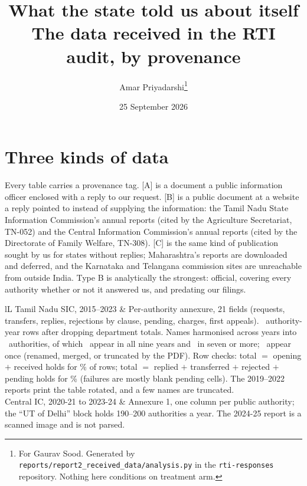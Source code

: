 \documentclass[11pt]{article}
\title{What the state told us about itself\\[2pt]\large The data received in the RTI audit, by provenance}
\author{Amar Priyadarshi\thanks{For Gaurav Sood. Generated by \texttt{reports/report2\_received\_data/analysis.py} in the \texttt{rti-responses} repository. Nothing here conditions on treatment arm.}}
\date{25 September 2026}
\newcommand{\prov}[1]{\textsf{\footnotesize[#1]}}
\begin{document}
\maketitle

\section*{Three kinds of data}
Every table carries a provenance tag. \prov{A} is a document a public information officer enclosed with a reply to our request. \prov{B} is a public document at a website a reply pointed to instead of supplying the information: the Tamil Nadu State Information Commission's annual reports (cited by the Agriculture Secretariat, TN-052) and the Central Information Commission's annual reports (cited by the Directorate of Family Welfare, TN-308). \prov{C} is the same kind of publication sought by us for states without replies; Maharashtra's reports are downloaded and deferred, and the Karnataka and Telangana commission sites are unreachable from outside India. Type B is analytically the strongest: official, covering every authority whether or not it answered us, and predating our filings.

\begin{table}[H]\centering\small
\caption{Coverage and parse quality of the commission data \prov{B}}
\begin{tabularx}{\textwidth}{lL}\toprule
Tamil Nadu SIC, 2015--2023 & Per-authority annexure, 21 fields (requests, transfers, replies, rejections by clause, pending, charges, first appeals). \qRows\ authority-year rows after dropping department totals. Names harmonised across years into \qKeys\ authorities, of which \qKeysNine\ appear in all nine years and \qKeysSeven\ in seven or more; \qKeysOne\ appear once (renamed, merged, or truncated by the PDF). Row checks: total $=$ opening $+$ received holds for \qOkTot\% of rows; total $=$ replied $+$ transferred $+$ rejected $+$ pending holds for \qOkDisp\% (failures are mostly blank pending cells). The 2019--2022 reports print the table rotated, and a few names are truncated. \\
Central IC, 2020-21 to 2023-24 & Annexure 1, one column per public authority; the ``UT of Delhi'' block holds 190--200 authorities a year. The 2024-25 report is a scanned image and is not parsed. \\
\bottomrule\end{tabularx}
\end{table}
\end{document}
